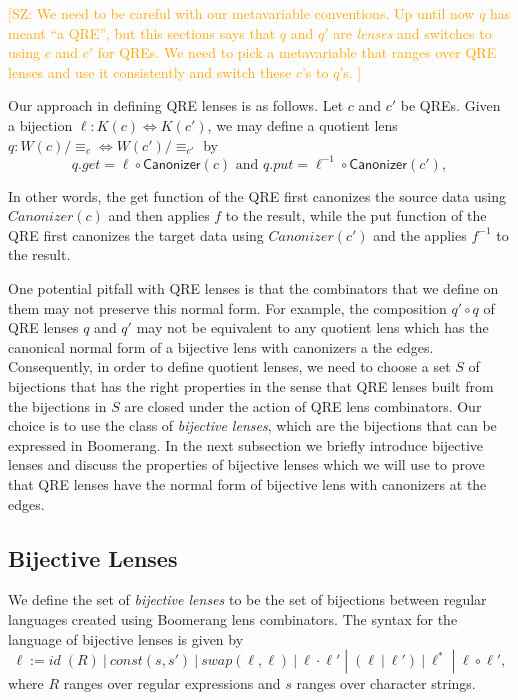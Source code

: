 \documentclass{svproc}
\newcommand{\FINISH}[3]{\ifdraft\textcolor{#1}{[#2: #3]}\fi}
\newcommand{\saz}[1]{\FINISH{orange}{SZ}{#1}}
\newcommand{\kw}[1]{\ensuremath{\mathsf{#1}}}
\newcommand{\sep}{\ensuremath{\ | \ }}
\newcommand{\canonizer}{\ensuremath{\kw{Canonizer}}}
\newcommand{\eqrel}[1]{\ensuremath{\equiv_{#1}}}
\begin{document}
\saz{We need to be careful with our metavariable conventions.  Up until now $q$
  has meant ``a QRE'', but this sections says that $q$ and $q'$ are
  \textit{lenses} and switches to using $c$ and $c'$ for QREs. We need to
  pick a metavariable that ranges over QRE lenses and use it consistently and
  switch these $c$'s to $q$'s.
}

Our approach in defining QRE lenses is as follows. Let $c$ and $c'$ be QREs. Given a
bijection $\ell : K(c) \Leftrightarrow K(c')$, we may define a quotient lens $q
: W(c)/\eqrel{c} \Leftrightarrow W(c')/\eqrel{c'}$ by
\begin{equation}\label{normalform}
q.get = \ell \circ \canonizer(c) \text{ and } q.put = \ell^{-1} \circ
\canonizer(c'),
\end{equation}

\noindent In other words, the get function of the QRE first canonizes the source
data using $\mathit{Canonizer}(c)$ and then applies $f$ to the result, while the
put function of the QRE first canonizes the target data using
$\mathit{Canonizer}(c')$ and the applies $f^{-1}$ to the result.

One potential pitfall with QRE lenses is that the combinators that
we define on them may not preserve this normal form. For example, the
composition $q' \circ q$ of QRE lenses $q$ and $q'$ may not be equivalent to
any quotient lens which has the canonical normal form of a bijective lens with
canonizers a the edges. Consequently, in order to define quotient lenses, we
need to choose a set $S$ of bijections that has the right properties in the
sense that QRE lenses built from the bijections in $S$ are closed under the
action of QRE lens combinators. Our choice is to use the class of
\textit{bijective lenses}, which are the bijections that can be expressed in
Boomerang. In the next subsection we briefly introduce bijective lenses and
discuss the properties of bijective lenses which we will use to prove that QRE
lenses have the normal form of bijective lens with canonizers at the edges.

\subsection{Bijective Lenses}
We define the set of \textit{bijective lenses} to be the set of bijections
between regular languages created using Boomerang lens combinators.
The syntax for the language of bijective lenses is given by
$$\ell := \mathit{id} \; (R) \sep const(s, s') \sep  swap(\ell,
\ell) \sep \ell \cdot \ell' \; |  \; (\ell \sep \ell') \sep \ell^* \;
| \; \ell \circ \ell',$$ where $R$ ranges over regular expressions and $s$
ranges over character strings.
\end{document}
